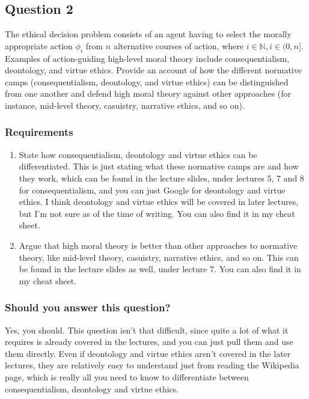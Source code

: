 \documentclass[11pt]{article}
\begin{document}
\subsection{Question 2}
\label{sec:orgae02cb2}
The ethical decision problem consists of an agent having to select the morally appropriate action \(\phi_i\) from \(n\) alternative courses of action, where \(i \in \mathbb{N}, i \in (0, n]\). Examples of action-guiding high-level moral theory include consequentialism, deontology, and virtue ethics. Provide an account of how the different normative camps (consequentialism, deontology, and virtue ethics) can be distinguished from one another and defend high moral theory against other approaches (for instance, mid-level theory, casuistry, narrative ethics, and so on).
\subsubsection{Requirements}
\label{sec:org9511b14}
\begin{enumerate}
\item State how consequentialism, deontology and virtue ethics can be differentiated. This is just stating what these normative camps are and how they work, which can be found in the lecture slides, under lectures 5, 7 and 8 for consequentialism, and you can just Google for deontology and virtue ethics. I think deontology and virtue ethics will be covered in later lectures, but I'm not sure as of the time of writing. You can also find it in my cheat sheet.
\item Argue that high moral theory is better than other approaches to normative theory, like mid-level theory, casuistry, narrative ethics, and so on. This can be found in the lecture slides as well, under lecture 7. You can also find it in my cheat sheet.
\end{enumerate}
\subsubsection{Should you answer this question?}
\label{sec:orge5b24a9}
Yes, you should. This question isn't that difficult, since quite a lot of what it requires is already covered in the lectures, and you can just pull them and use them directly. Even if deontology and virtue ethics aren't covered in the later lectures, they are relatively easy to understand just from reading the Wikipedia page, which is really all you need to know to differentiate between consequentialism, deontology and virtue ethics.
\end{document}

